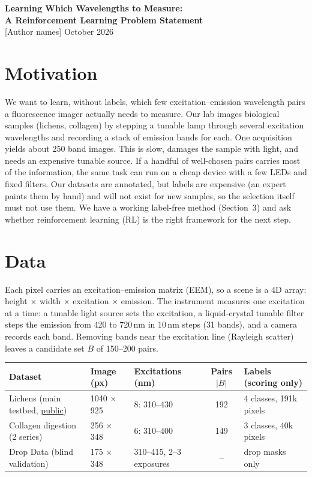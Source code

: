 \documentclass[11pt,a4paper]{article}
\begin{document}
\begin{center}
{\Large\bfseries Learning Which Wavelengths to Measure:\\[2pt]
A Reinforcement Learning Problem Statement}\\[6pt]
[Author names] \quad\textperiodcentered{} October 2026
\end{center}

\section{Motivation}
We want to learn, without labels, which few excitation--emission wavelength pairs a fluorescence imager actually needs to measure. Our lab images biological samples (lichens, collagen) by stepping a tunable lamp through several excitation wavelengths and recording a stack of emission bands for each. One acquisition yields about 250 band images. This is slow, damages the sample with light, and needs an expensive tunable source. If a handful of well-chosen pairs carries most of the information, the same task can run on a cheap device with a few LEDs and fixed filters. Our datasets are annotated, but labels are expensive (an expert paints them by hand) and will not exist for new samples, so the selection itself must not use them. We have a working label-free method (Section~3) and ask whether reinforcement learning (RL) is the right framework for the next step.

\section{Data}
Each pixel carries an excitation--emission matrix (EEM), so a scene is a 4D array: height $\times$ width $\times$ excitation $\times$ emission. The instrument measures one excitation at a time: a tunable light source sets the excitation, a liquid-crystal tunable filter steps the emission from 420 to 720\,nm in 10\,nm steps (31 bands), and a camera records each band. Removing bands near the excitation line (Rayleigh scatter) leaves a candidate set $B$ of 150--200 pairs.

\smallskip
\begin{tabularx}{\linewidth}{@{}l l l c L@{}}
\toprule
Dataset & Image (px) & Excitations (nm) & Pairs $|B|$ & Labels (scoring only) \\
\midrule
Lichens (main testbed, \href{https://doi.org/10.5281/zenodo.18640119}{public}) & 1040 $\times$ 925 & 8: 310--430 & 192 & 4 classes, 191k pixels \\
Collagen digestion (2 series) & 256 $\times$ 348 & 6: 310--400 & 149 & 3 classes, 40k pixels \\
Drop Data (blind validation) & 175 $\times$ 348 & 310--415, 2--3 exposures & -- & drop masks only \\
\bottomrule
\end{tabularx}
\end{document}
